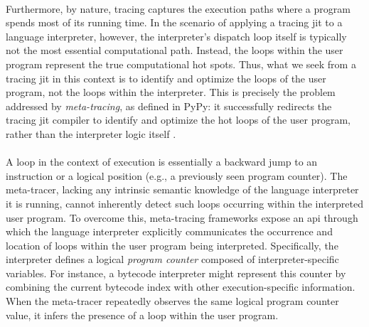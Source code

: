         \paragraph{}%
            Furthermore, by nature, tracing captures the execution paths where a program spends most of its running time. In the scenario of applying a tracing \gls{jit} to a language interpreter, however, the interpreter's dispatch loop itself is typically not the most essential computational path. Instead, the loops within the user program represent the true computational hot spots. Thus, what we seek from a tracing \gls{jit} in this context is to identify and optimize the loops of the user program, not the loops within the interpreter. This is precisely the problem addressed by \emph{meta-tracing}, as defined in PyPy: it successfully redirects the tracing \gls{jit} compiler to identify and optimize the hot loops of the user program, rather than the interpreter logic itself \cite{pypy-main}.

        \paragraph{}%
            A loop in the context of execution is essentially a backward jump to an instruction or a logical position (e.g., a previously seen program counter). The meta-tracer, lacking any intrinsic semantic knowledge of the language interpreter it is running, cannot inherently detect such loops occurring within the interpreted user program. To overcome this, meta-tracing frameworks expose an \gls{api} through which the language interpreter explicitly communicates the occurrence and location of loops within the user program being interpreted. Specifically, the interpreter defines a logical \emph{program counter} composed of interpreter-specific variables. For instance, a bytecode interpreter might represent this counter by combining the current bytecode index with other execution-specific information. When the meta-tracer repeatedly observes the same logical program counter value, it infers the presence of a loop within the user program.

